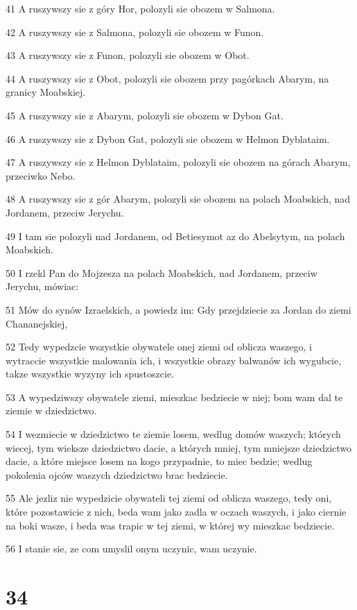 \par 41 A ruszywszy sie z góry Hor, polozyli sie obozem w Salmona.
\par 42 A ruszywszy sie z Salmona, polozyli sie obozem w Funon.
\par 43 A ruszywszy sie z Funon, polozyli sie obozem w Obot.
\par 44 A ruszywszy sie z Obot, polozyli sie obozem przy pagórkach Abarym, na granicy Moabskiej.
\par 45 A ruszywszy sie z Abarym, polozyli sie obozem w Dybon Gat.
\par 46 A ruszywszy sie z Dybon Gat, polozyli sie obozem w Helmon Dyblataim.
\par 47 A ruszywszy sie z Helmon Dyblataim, polozyli sie obozem na górach Abarym, przeciwko Nebo.
\par 48 A ruszywszy sie z gór Abarym, polozyli sie obozem na polach Moabskich, nad Jordanem, przeciw Jerychu.
\par 49 I tam sie polozyli nad Jordanem, od Betiesymot az do Abelsytym, na polach Moabskich.
\par 50 I rzekl Pan do Mojzesza na polach Moabskich, nad Jordanem, przeciw Jerychu, mówiac:
\par 51 Mów do synów Izraelskich, a powiedz im: Gdy przejdziecie za Jordan do ziemi Chananejskiej,
\par 52 Tedy wypedzcie wszystkie obywatele onej ziemi od oblicza waszego, i wytraccie wszystkie malowania ich, i wszystkie obrazy balwanów ich wygubcie, takze wszystkie wyzyny ich spustoszcie.
\par 53 A wypedziwszy obywatele ziemi, mieszkac bedziecie w niej; bom wam dal te ziemie w dziedzictwo.
\par 54 I wezmiecie w dziedzictwo te ziemie losem, wedlug domów waszych; których wiecej, tym wieksze dziedzictwo dacie, a których mniej, tym mniejsze dziedzictwo dacie, a które miejsce losem na kogo przypadnie, to miec bedzie; wedlug pokolenia ojców waszych dziedzictwo brac bedziecie.
\par 55 Ale jezliz nie wypedzicie obywateli tej ziemi od oblicza waszego, tedy oni, które pozostawicie z nich, beda wam jako zadla w oczach waszych, i jako ciernie na boki wasze, i beda was trapic w tej ziemi, w której wy mieszkac bedziecie.
\par 56 I stanie sie, ze com umyslil onym uczynic, wam uczynie.

\chapter{34}

